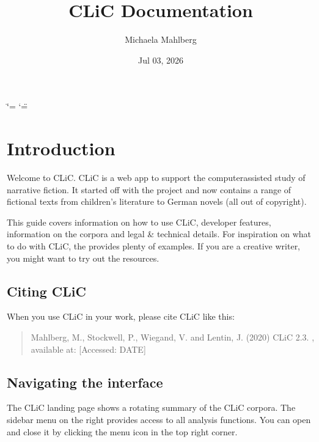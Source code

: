 \documentclass[letterpaper,10pt,english]{sphinxmanual}
\title{CLiC Documentation}
\date{Jul 03, 2026}
\author{Michaela Mahlberg}
\newcommand{\sphinxcontribyoutube}[3]{\begin{quote}\begin{center}\fbox{\url{#1#2#3}}\end{center}\end{quote}}
\begin{document}
\ifdefined\shorthandoff
  \ifnum\catcode`\=\string=\active\shorthandoff{=}\fi
  \ifnum\catcode`\"=\active{}\fi
\fi

\pagestyle{empty}
\sphinxmaketitle
\pagestyle{plain}
\sphinxtableofcontents
\pagestyle{normal}
\label{\detokenize{index::doc}}


\sphinxstepscope


\chapter{Introduction}
\label{\detokenize{introduction:introduction}}\label{\detokenize{introduction::doc}}
\sphinxAtStartPar
Welcome to CLiC. CLiC is a web app to support the computer\sphinxhyphen{}assisted
study of narrative fiction. It started off with the
project and now contains a range of fictional texts from children’s
literature to German novels (all out of copyright).
\sphinxcontribyoutube{https://youtu.be/}{yv6OP3W2NDE}{}

\sphinxAtStartPar
This guide covers information on how to use CLiC, developer features,
information on the corpora and legal \& technical details. For inspiration
on what to do with CLiC, the
 provides plenty
of examples. If you are a creative writer, you might want to try out the
resources.


\section{Citing CLiC}
\label{\detokenize{introduction:citing-clic}}\label{\detokenize{introduction:id1}}
\sphinxAtStartPar
When you use CLiC in your work, please cite CLiC like this:
\begin{quote}

\sphinxAtStartPar
Mahlberg, M., Stockwell, P., Wiegand, V. and Lentin, J. (2020)
CLiC 2.3. , available at:
 {[}Accessed: DATE{]}
\end{quote}


\section{Navigating the interface}
\label{\detokenize{introduction:navigating-the-interface}}\label{\detokenize{introduction:id2}}
\sphinxAtStartPar
The CLiC landing page shows a rotating summary of the CLiC corpora.
The sidebar menu on the right provides access to all analysis functions.
You can open and close it by clicking the menu icon in the top right
corner.
\end{document}
